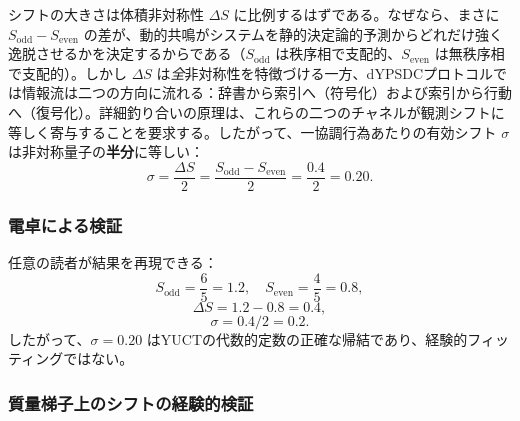\documentclass[11pt,a4paper]{article}
\begin{document}
	シフトの大きさは体積非対称性 \(\Delta S\) に比例するはずである。なぜなら、まさに \(S_{\mathrm{odd}} - S_{\mathrm{even}}\) の差が、動的共鳴がシステムを静的決定論的予測からどれだけ強く逸脱させるかを決定するからである（\(S_{\mathrm{odd}}\) は秩序相で支配的、\(S_{\mathrm{even}}\) は無秩序相で支配的）。しかし \(\Delta S\) は\textit{全}非対称性を特徴づける一方、dYPSDCプロトコルでは情報流は二つの方向に流れる：辞書から索引へ（符号化）および索引から行動へ（復号化）。詳細釣り合いの原理は、これらの二つのチャネルが観測シフトに等しく寄与することを要求する。したがって、一協調行為あたりの有効シフト \(\sigma\) は非対称量子の\textbf{半分}に等しい：
	\begin{equation}
		\boxed{\sigma = \frac{\Delta S}{2} = \frac{S_{\mathrm{odd}} - S_{\mathrm{even}}}{2} = \frac{0.4}{2} = 0.20.}
		\label{eq:sigma_final}
	\end{equation}
	
	\subsubsection{電卓による検証}
	
	任意の読者が結果を再現できる：
	\[
	S_{\mathrm{odd}} = \frac{6}{5} = 1.2,\quad S_{\mathrm{even}} = \frac{4}{5} = 0.8,
	\]
	\[
	\Delta S = 1.2 - 0.8 = 0.4,
	\]
	\[
	\sigma = 0.4 / 2 = 0.2.
	\]
	したがって、\(\sigma = 0.20\) はYUCTの代数的定数の正確な帰結であり、経験的フィッティングではない。
	
	\subsubsection{質量梯子上のシフトの経験的検証}
	
\end{document}
